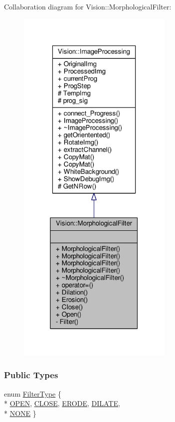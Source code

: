 Collaboration diagram for Vision\+:\+:Morphological\+Filter\+:
\nopagebreak
\begin{figure}[H]
\begin{center}
\leavevmode
\includegraphics[width=211pt]{class_vision_1_1_morphological_filter__coll__graph}
\end{center}
\end{figure}
\subsubsection*{Public Types}
\begin{DoxyCompactItemize}
\item 
enum \hyperlink{class_vision_1_1_morphological_filter_a1f19c9cb13f0d68778c77d6fd0370868}{Filter\+Type} \{ \\*
\hyperlink{class_vision_1_1_morphological_filter_a1f19c9cb13f0d68778c77d6fd0370868afd436eed00afa15b23eeac4de3509303}{O\+P\+E\+N}, 
\hyperlink{class_vision_1_1_morphological_filter_a1f19c9cb13f0d68778c77d6fd0370868a0e01d9ebb7d53eaa2ae98ea36cc810f6}{C\+L\+O\+S\+E}, 
\hyperlink{class_vision_1_1_morphological_filter_a1f19c9cb13f0d68778c77d6fd0370868a4ca3c81298a713b3d1f279c9233e7547}{E\+R\+O\+D\+E}, 
\hyperlink{class_vision_1_1_morphological_filter_a1f19c9cb13f0d68778c77d6fd0370868afbd91b5e6d75b6bcfc8faca3f5da7c47}{D\+I\+L\+A\+T\+E}, 
\\*
\hyperlink{class_vision_1_1_morphological_filter_a1f19c9cb13f0d68778c77d6fd0370868a8bc137e512a8def100d5ce92af334438}{N\+O\+N\+E}
 \}
\end{DoxyCompactItemize}
